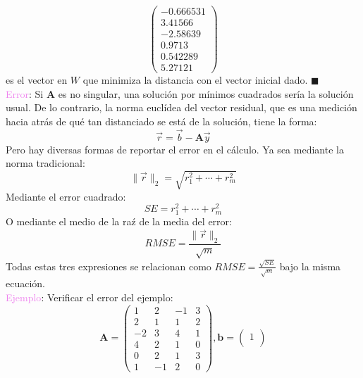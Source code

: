 \documentclass[11pt]{article}
\theoremstyle{definition}
\begin{document}
\begin{enumerate}[(i)]
\begin{equation*}
\begin{pmatrix}
-0.666531\\
3.41566\\
-2.58639\\
0.9713\\
0.542289\\
5.27121
\end{pmatrix}
\end{equation*}
es el vector en $W$ que minimiza la distancia con el vector inicial dado. $\blacksquare$ \\
\vspace{2mm} %
\textcolor{violet}{Error}: Si $\textbf{A}$ es no singular, una soluci\'on por m\'inimos cuadrados ser\'ia la soluci\'on usual. De lo contrario, la norma eucl\'idea del vector residual, que es una medici\'on hacia atr\'as de qu\'e tan distanciado se est\'a de la soluci\'on, tiene la forma:
\begin{equation*}
\vec{r} = \vec{b} - \textbf{A}\vec{y}
\end{equation*}
Pero hay diversas formas de reportar el error en el c\'alculo. Ya sea mediante la norma tradicional:
\begin{equation*}
\|\vec{r}\|_{2} = \sqrt{r_{1}^{2} + \cdots + r_{m}^{2}}
\end{equation*}
Mediante el error cuadrado:
\begin{equation*}
SE = r_{1}^{2} + \cdots + r_{m}^{2}
\end{equation*}
O mediante el medio de la ra\'z de la media del error:
\begin{equation*}
RMSE = \frac{\|\vec{r}\|_{2}}{\sqrt{m}}
\end{equation*}
Todas estas tres expresiones se relacionan como $RMSE = \frac{\sqrt{SE}}{\sqrt{m}}$ bajo la misma ecuaci\'on.\\
\vspace{2mm} %
\textcolor{violet}{Ejemplo}: Verificar el error del ejemplo:
\begin{equation*}
\textbf{A} =
\begin{pmatrix}
1 & 2 & -1 & 3\\
2 & 1 & 1 & 2\\
-2 & 3 & 4 & 1\\
4 & 2 & 1 & 0\\
0 & 2 & 1 & 3\\
1 & -1 & 2 & 0
\end{pmatrix}, 
\textbf{b} =
\begin{pmatrix}
1\\

\end{pmatrix}
\end{equation*}
\end{enumerate}
\end{document}
